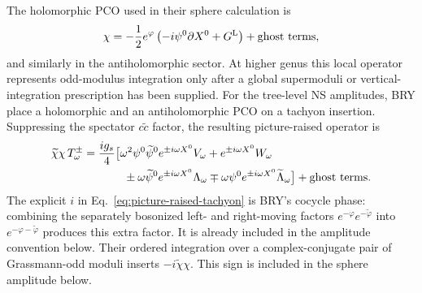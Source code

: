 \documentclass[11pt]{article}
\begin{document}
The holomorphic PCO used in their sphere calculation is
\begin{equation}
 \chi=-\frac12e^\varphi
 \left(-i\psi^0\partial X^0+G^{\rm L}\right)
 +\text{ghost terms},
 \label{eq:bry-pco}
\end{equation}
and similarly in the antiholomorphic sector.  At higher genus this local
operator represents odd-modulus integration only after a global
supermoduli or vertical-integration prescription has been supplied.
For the tree-level NS amplitudes, BRY place a holomorphic and an
antiholomorphic PCO on a tachyon insertion.  Suppressing the spectator
$c\widetilde c$ factor, the resulting picture-raised operator is
\begin{align}
 \widetilde\chi\chi\,T_\omega^\pm
 =\frac{ig_s}{4}\big[&
 \omega^2\psi^0\widetilde\psi^0e^{\pm i\omega X^0}V_\omega
 +e^{\pm i\omega X^0}W_\omega\notag\\
 &\ \pm\omega\widetilde\psi^0e^{\pm i\omega X^0}\Lambda_\omega
 \mp\omega\psi^0e^{\pm i\omega X^0}\widetilde\Lambda_\omega
 \big]+\text{ghost terms}.
 \label{eq:picture-raised-tachyon}
\end{align}
The explicit $i$ in Eq.~\eqref{eq:picture-raised-tachyon} is BRY's cocycle
phase: combining the separately bosonized left- and right-moving factors
$e^{-\varphi}e^{-\widetilde\varphi}$ into
$e^{-\varphi-\widetilde\varphi}$ produces this extra factor.  It is already
included in the amplitude convention below.
Their ordered integration over a complex-conjugate pair of Grassmann-odd
moduli inserts $-i\widetilde\chi\chi$.  This sign is included in the
sphere amplitude below.
\end{document}
